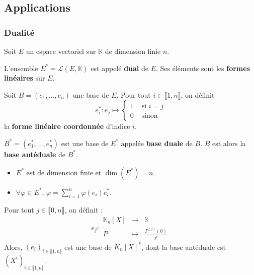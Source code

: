 	\subsection{Applications}

	\subsubsection{Dualité}
	
	Soit $E$ un espace vectoriel sur $\mathbb{K}$ de dimension finie $n$.
	
	\begin{definition}
		L'ensemble $E^* = \mathcal{L}(E, \mathbb{K})$ est appelé \textbf{dual} de $E$. Ses éléments sont les \textbf{formes linéaires} sur $E$.
	\end{definition}
	
	\begin{definition}
		Soit $B = (e_1, \dots, e_n)$ une base de $E$. Pour tout $i \in \llbracket 1, n \rrbracket$, on définit
		\[
		e_i^* : e_j \mapsto
		\begin{cases}
			1 &\text{ si } i = j \\
			0 &\text{ sinon}
		\end{cases}
		\]
		la \textbf{forme linéaire coordonnée} d'indice $i$.
	\end{definition}
	
	\begin{theorem}
		$B^* = (e_1^*, \dots, e_n^*)$ est une base de $E^*$ appelée \textbf{base duale} de $B$. $B$ est alors la \textbf{base antéduale} de $B^*$.
	\end{theorem}
	
	\begin{corollary}
		\begin{itemize}
			\item $E^*$ est de dimension finie et $\dim(E^*) = n$.
			\item $\forall \varphi \in E^*, \, \varphi = \sum_{i=1}^n \varphi(e_i) e_i^*$.
		\end{itemize}
	\end{corollary}
	
	
	\begin{application}
		Pour tout $j \in \llbracket 0, n \rrbracket$, on définit :
		\[
			e_j : \begin{array}{ccc}
				\mathbb{K}_n[X] &\rightarrow& \mathbb{K} \\
				P &\mapsto& \frac{P^{(j)}(0)}{j!}
			\end{array}
		\]
		Alors, $(e_i)_{i \in \llbracket 1, n \rrbracket}$ est une base de $K_n[X]^*$, dont la base antéduale est $(X^i)_{i \in \llbracket 1, n \rrbracket}$.
	\end{application}

